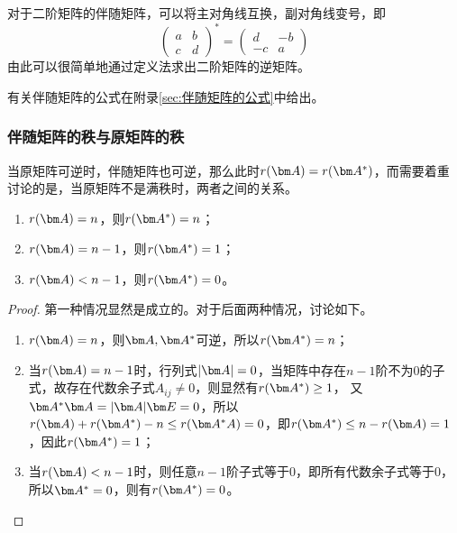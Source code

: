 对于二阶矩阵的伴随矩阵，可以将主对角线互换，副对角线变号，即
\begin{equation}
    \begin{pmatrix}
        a & b \\
        c & d
    \end{pmatrix}^*
    =
    \begin{pmatrix}
        d  & -b \\
        -c & a
    \end{pmatrix}
\end{equation}
由此可以很简单地通过定义法求出二阶矩阵的逆矩阵。

有关伴随矩阵的公式在附录\ref{sec:伴随矩阵的公式}中给出。
\subsubsection{伴随矩阵的秩与原矩阵的秩}
当原矩阵可逆时，伴随矩阵也可逆，那么此时$r(\mat{A})=r(\mat{A}^*)$，而需要着重讨论的是，当原矩阵不是满秩时，两者之间的关系。

\begin{enumerate}[(1)]
    \item $r(\mat{A})=n$，则$r(\mat{A}^*)=n$；
    \item $r(\mat{A})=n-1$，则$r(\mat{A}^*)=1$；
    \item $r(\mat{A})<n-1$，则$r(\mat{A}^*)=0$。
\end{enumerate}
\begin{proof}
    第一种情况显然是成立的。对于后面两种情况，讨论如下。
    \begin{enumerate}[(1)]
        \item $r(\mat{A})=n$，则$\mat{A},\mat{A}^*$可逆，所以$r(\mat{A}^*)=n$；
        \item 当$r(\mat{A})=n-1$时，行列式$|\mat{A}|=0$，当矩阵中存在$n-1$阶不为$0$的子式，故存在代数余子式$A_{ij}\neq 0$，则显然有$r(\mat{A}^*)\geq 1$，
              又$\mat{A}^*\mat{A} = |\mat{A}|\mat{E} = 0$，所以$r(\mat{A})+r(\mat{A}^*)-n\leq r(\mat{A}^*A) = 0$，即$r(\mat{A}^*)\leq n - r(\mat{A}) = 1$，因此$r(\mat{A}^*)=1$；
        \item 当$r(\mat{A})<n-1$时，则任意$n-1$阶子式等于$0$，即所有代数余子式等于$0$，所以$\mat{A}^*=0$，则有$r(\mat{A}^*)=0$。
    \end{enumerate}
\end{proof}

